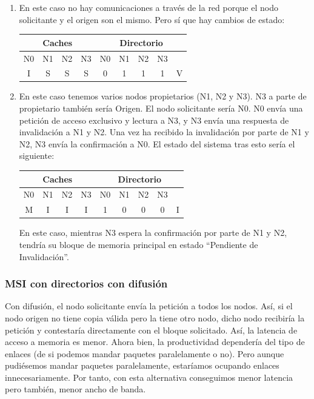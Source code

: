 \documentclass[10pt,a4paper,spanish]{report}
\begin{document}
\begin{enumerate}[a)]
\begin{enumerate}[1.]
    \item En este caso no hay comunicaciones a través de la red porque el nodo solicitante y el origen son el mismo. Pero sí que hay cambios de estado:

    \begin{center}
    \begin{tabular}{|c|c|c|c|c|c|c|c|c|}
    \hline
    \multicolumn{4}{|c|}{Caches} & \multicolumn{5}{|c|}{Directorio} \\
    \hline
    N0 & N1 & N2 & N3 & N0 & N1 & N2 & N3 & \\
    \hline
    I & S & S & S & 0 & 1 & 1 & 1 & V \\
    \hline
    \end{tabular}
    \end{center}

    \item En este caso tenemos varios nodos propietarios (N1, N2 y N3). N3 a parte de propietario también sería Origen. El nodo solicitante sería N0. N0 envía una petición de acceso exclusivo y lectura a N3, y N3 envía una respuesta de invalidación a N1 y N2. Una vez ha recibido la invalidación por parte de N1 y N2, N3 envía la confirmación a N0. El estado del sistema tras esto sería el siguiente:

    \begin{center}
    \begin{tabular}{|c|c|c|c|c|c|c|c|c|}
    \hline
    \multicolumn{4}{|c|}{Caches} & \multicolumn{5}{|c|}{Directorio} \\
    \hline
    N0 & N1 & N2 & N3 & N0 & N1 & N2 & N3 & \\
    \hline
    M & I & I & I & 1 & 0 & 0 & 0 & I \\
    \hline
    \end{tabular}
    \end{center}

    En este caso, mientras N3 espera la confirmación por parte de N1 y N2, tendría su bloque de memoria principal en estado ``Pendiente de Invalidación''.
\end{enumerate}
\end{enumerate}

\textcolor[rgb]{0.2,0.4,0.8}{\subsubsection{MSI con directorios con difusión}}
Con difusión, el nodo solicitante envía la petición a todos los nodos. Así, si el nodo origen no tiene copia válida pero la tiene otro nodo, dicho nodo recibiría la petición y contestaría directamente con el bloque solicitado. Así, la latencia de acceso a memoria es menor. Ahora bien, la productividad dependería del tipo de enlaces (de si podemos mandar paquetes paralelamente o no). Pero aunque pudiésemos mandar paquetes paralelamente, estaríamos ocupando enlaces innecesariamente. Por tanto, con esta alternativa conseguimos menor latencia pero también, menor ancho de banda. 
\end{document}
